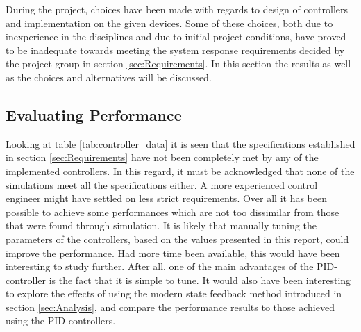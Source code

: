 \documentclass[../../main.tex]{subfiles}
\begin{document}

During the project, choices have been made with regards to design of controllers and implementation on the given devices. Some of these choices, both due to inexperience in the disciplines and due to initial project conditions, have proved to be inadequate towards meeting the system response requirements decided by the project group in section \ref{sec:Requirements}. In this section the results as well as the choices and alternatives will be discussed.

\subsection{Evaluating Performance}

Looking at table \ref{tab:controller_data} it is seen that the specifications established in section \ref{sec:Requirements} have not been completely met by any of the implemented controllers. In this regard, it must be acknowledged that none of the simulations meet all the specifications either. A more experienced control engineer might have settled on less strict requirements.
Over all it has been possible to achieve some performances which are not too dissimilar from those that were found through simulation. It is likely that manually tuning the parameters of the controllers, based on the values presented in this report, could improve the performance. Had more time been available, this would have been interesting to study further. After all, one of the main advantages of the PID-controller is the fact that it is simple to tune. It would also have been interesting to explore the effects of using the modern state feedback method introduced in section \ref{sec:Analysis}, and compare the performance results to those achieved using the PID-controllers.
\end{document}

